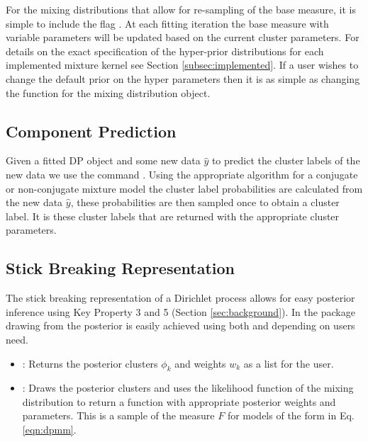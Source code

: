 \documentclass[nojss]{jss}
\begin{document}
For the mixing distributions that allow for re-sampling of the base measure, it is simple to include the flag . At each fitting iteration the base measure with variable parameters will be updated based on the current cluster parameters. For details on the exact specification of the hyper-prior distributions for each implemented mixture kernel see Section \ref{subsec:implemented}.  If a user wishes to change the default prior on the hyper parameters then it is as simple as changing the  function for the mixing distribution object.




\subsection{Component Prediction}
Given a fitted DP object and some new data $\hat{y}$ to predict the cluster labels of the new data we use the command . Using the appropriate algorithm for a conjugate or non-conjugate mixture model the cluster label probabilities are calculated from the new data $\hat{y}$, these probabilities are then sampled once to obtain a cluster label. It is these cluster labels that are returned with the appropriate cluster parameters.

\subsection{Stick Breaking Representation}
The stick breaking representation of a Dirichlet process allows for easy posterior inference using Key Property 3 and 5 (Section \ref{sec:background}). In the  package drawing from the posterior is easily achieved using both  and  depending on users need.
\begin{itemize}
\item {}: Returns the posterior clusters $\phi _k$ and weights $w_k$ as a list for the user.
\item {}: Draws the posterior clusters and uses the likelihood function of the mixing distribution to return a function with appropriate posterior weights and parameters. This is a sample of the measure $F$ for models of the form in Eq. \eqref{eqn:dpmm}.
\end{itemize}
\end{document}

